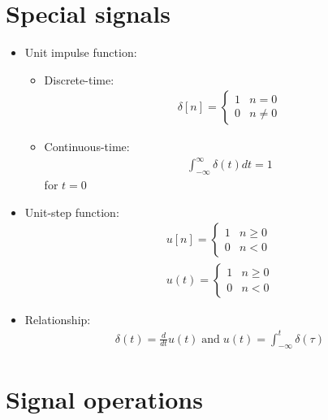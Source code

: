 \documentclass[conference]{IEEEtran}
\begin{document}
\section{Special signals}

\begin{itemize}
  \item Unit impulse function:
  \begin{itemize}
    \item Discrete-time:
    \begin{align*}
      \delta[n] = \begin{cases}
        1 & n=0 \\
        0 & n\neq 0
      \end{cases}
    \end{align*}

    \item Continuous-time:
    \begin{align*}
      \int_{-\infty}^\infty \delta(t) dt = 1
    \end{align*}
    for $t=0$
  \end{itemize}

  \item Unit-step function:
  \begin{align*}
    u[n] = \begin{cases}
      1 & n \geq 0 \\
      0 & n < 0
    \end{cases} \\
    u(t) = \begin{cases}
      1 & n \geq 0 \\
      0 & n < 0
    \end{cases} 
  \end{align*}

  \item Relationship:
  \begin{align*}
    \delta(t) = \frac{d}{dt} u(t) \; \text{and} \; u(t) = \int_{-\infty}^t \delta(\tau)
  \end{align*}
\end{itemize}

\pagebreak
\section{Signal operations}
\end{document}
